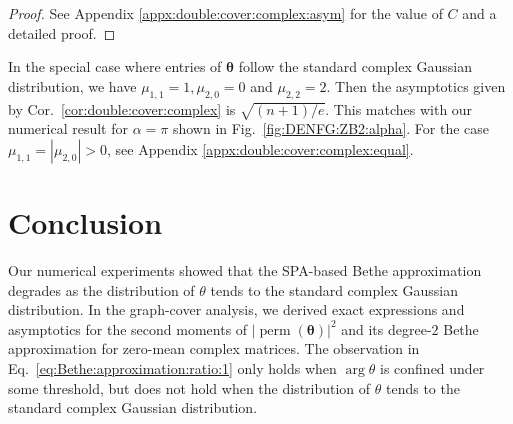 \documentclass[conference]{IEEEtran}
\theoremstyle{plain}
\theoremstyle{definition}
\newcommand{\perm}{\operatorname{perm}}
\newcommand{\btheta}{\boldsymbol{\theta}}
\begin{document}

\begin{proof}
 See \iflongversion Appendix \ref{appx:double:cover:complex:asym}
 \else
  \cite{zhou2026}
 \fi
 for the value of $C$ and a detailed proof.
\end{proof}


In the special case where entries of $\btheta$ follow the standard complex
Gaussian distribution, we have $\mu_{1,1}=1,\mu_{2,0}=0$ and $\mu_{2,2}= 2$.
Then the asymptotics given by Cor.~\ref{cor:double:cover:complex} is
$\sqrt{(n+1)/e}$. This matches with our numerical result for $\alpha=\pi$ shown
in Fig.~\ref{fig:DENFG:ZB2:alpha}. For the case \(\mu_{1,1}=|\mu_{2,0}|>0\), see 
Appendix \ref{appx:double:cover:complex:equal}.


\section{Conclusion}


Our numerical experiments showed that the SPA-based Bethe approximation
degrades as the distribution of $\theta$ tends to the standard complex Gaussian
distribution. In the graph-cover analysis, we derived exact expressions and
asymptotics for the second moments of $|\perm(\btheta)|^2$ and its degree-$2$
Bethe approximation for zero-mean complex matrices. The observation in
Eq.~\eqref{eq:Bethe:approximation:ratio:1} only holds when $\arg{\theta}$ is
confined under some threshold, but does not hold when the distribution of
$\theta$ tends to the standard complex Gaussian distribution.


\newpage



\iflongversion
 \onecolumn
 \appendices

\end{document}
